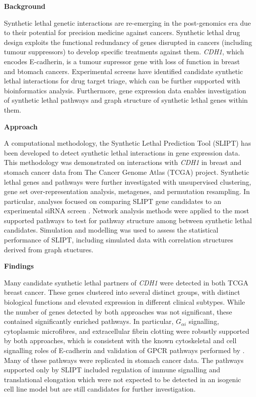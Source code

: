 \textbf{Background}

Synthetic lethal genetic interactions are re-emerging in the post-genomics era due to their potential for precision medicine against cancers. Synthetic lethal drug design exploits the functional redundancy of genes disrupted in cancers (including tumour suppressors) to develop specific treatments against them. \textit{CDH1}, which encodes \gls{E-cadherin}, is a tumour supressor gene with loss of function in breast and btomach cancers. Experimental screens have identified candidate synthetic lethal interactions for drug target triage, which can be further supported with bioinformatics analysis. Furthermore, gene expression data enables investigation of synthetic lethal pathways and graph structure of synthetic lethal genes within them. 

\textbf{Approach}

A computational methodology, the Synthetic Lethal Prediction Tool (\acrshort{SLIPT}) has been developed to detect synthetic lethal interactions in gene expression data. This methodology was demonstrated on interactions with \textit{CDH1} in breast and stomach cancer data from The Cancer Genome Atlas (\acrshort{TCGA}) project. Synthetic lethal genes and pathways were further investigated with unsupervised clustering, gene set over-representation analysis, metagenes, and permutation resampling. In particular, analyses focused on comparing \acrshort{SLIPT} gene candidates to an experimental \acrshort{siRNA} screen \citet{Telford2015}. Network analysis methods were applied to the most supported pathways to test for pathway structure among between synthetic lethal candidates. Simulation and modelling was used to assess the statistical performance of \acrshort{SLIPT}, including simulated data with correlation structures derived from graph stuctures.

\textbf{Findings}

Many candidate synthetic lethal partners of \textit{CDH1} were detected in both \acrshort{TCGA} breast cancer. These genes clustered into several distinct groups, with distinct biological functions and elevated expression in different clinical subtypes. While the number of genes detected by both approaches was not significant, these contained significantly enriched pathways. In particular, $G_{\alpha i}$ signalling, cytoplasmic microfibres, and extracellular fibrin clotting were robustly supported by both approaches, which is consistent with the known cytoskeletal and cell signalling roles of \gls{E-cadherin} and validation of \acrshort{GPCR} pathways performed by \citet{Telford2015}. Many of these pathways were replicated in stomach cancer data. The pathways supported only by \acrshort{SLIPT} included regulation of immune signalling and translational elongation which were not expected to be detected in an isogenic cell line model but are still candidates for further investigation. 

